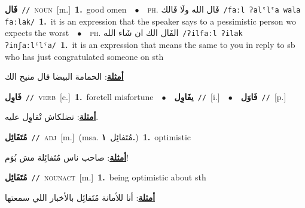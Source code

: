 \documentclass[10pt,a4paper,twoside]{article} %
\begin{document}
\begin{multicols}{2}
{{\setlength\topsep{0pt}\textbf{\foreignlanguage{arabic}{فَال}}\ {\color{gray}\texttt{//}\color{black}}\ \textsc{noun}\ [m.]\ \textbf{1.}~good omen\ \ $\bullet$\ \ \textsc{ph.} \color{gray} \foreignlanguage{arabic}{فَال الله ولَا فَالك}\color{black}\ {\color{gray}\texttt{/{\sffamily faːl ʔalˤlˤa wala faːlak}/}\color{black}}\ \textbf{1.}~it is an expression that the speaker says to a pessimistic person wo expects the worst\ \ $\bullet$\ \ \textsc{ph.} \color{gray} \foreignlanguage{arabic}{الفَال الك ان شَاء الله}\color{black}\ {\color{gray}\texttt{/{\sffamily ʔilfaːl ʔilak ʔinʃaːlˤlˤa}/}\color{black}}\ \textbf{1.}~it is an expression that means the same to you in reply to sb who has just congratulated someone on sth\  \begin{flushright}\color{gray}\foreignlanguage{arabic}{\textbf{\underline{\foreignlanguage{arabic}{أمثلة}}}: الحمامة البيضا فال منيح الك}\end{flushright}\color{black}} \vspace{2mm}

{\setlength\topsep{0pt}\textbf{\foreignlanguage{arabic}{فَاوِل}}\ {\color{gray}\texttt{//}\color{black}}\ \textsc{verb}\ [c.]\ \textbf{1.}~foretell misfortune\ \ $\bullet$\ \ \setlength\topsep{0pt}\textbf{\foreignlanguage{arabic}{يفَاوِل}}\ {\color{gray}\texttt{//}\color{black}}\ [i.]\ \ $\bullet$\ \ \setlength\topsep{0pt}\textbf{\foreignlanguage{arabic}{فَاوَل}}\ {\color{gray}\texttt{//}\color{black}}\ [p.]\  \begin{flushright}\color{gray}\foreignlanguage{arabic}{\textbf{\underline{\foreignlanguage{arabic}{أمثلة}}}: تضلكاش تْفاوِل عليه.}\end{flushright}\color{black}} \vspace{2mm}

{\setlength\topsep{0pt}\textbf{\foreignlanguage{arabic}{مُتَفَائِل}}\ {\color{gray}\texttt{//}\color{black}}\ \textsc{adj}\ [m.]\ \color{gray}(msa. \foreignlanguage{arabic}{مُتَفائِل}~\foreignlanguage{arabic}{\textbf{١.}})\color{black}\ \textbf{1.}~optimistic\  \begin{flushright}\color{gray}\foreignlanguage{arabic}{\textbf{\underline{\foreignlanguage{arabic}{أمثلة}}}: صاحب ناس مُتَفائِلة مش بُوَم!}\end{flushright}\color{black}} \vspace{2mm}

{\setlength\topsep{0pt}\textbf{\foreignlanguage{arabic}{مُتَفَائِل}}\ {\color{gray}\texttt{//}\color{black}}\ \textsc{noun\textunderscore act}\ [m.]\ \textbf{1.}~being optimistic about sth\  \begin{flushright}\color{gray}\foreignlanguage{arabic}{\textbf{\underline{\foreignlanguage{arabic}{أمثلة}}}: أنا للأمانة مُتَفائِل بالأخبار اللي سمعتها}\end{flushright}\color{black}} \vspace{2mm}

}
\end{multicols}
\end{document}
